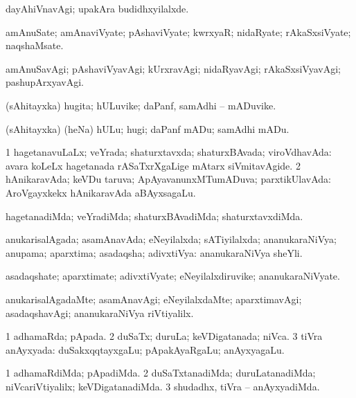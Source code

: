 \bentry
{}
\gl{\kirxvi}
\bmng
dayAhiVnavAgi; upakAra budidhxyilalxde. 
\emng
\eentry

\bentry
{}
\gl{\nA}
\bmng
amAnuSate; amAnaviVyate; pAshaviVyate; kwrxyaR; nidaRyate; rAkaSxsiVyate; naqshaMsate. 
\emng
\eentry

\bentry
{}
\gl{\kirxvi}
\bmng
amAnuSavAgi; pAshaviVyavAgi; kUrxravAgi; nidaRyavAgi; rAkaSxsiVyavAgi; pashupArxyavAgi. 
\emng
\eentry

\bentry
{}
\gl{\nA}
\bmng
(sAhitayxka) hugita; hULuvike; daPanf, samAdhi -- mADuvike. 
\emng
\eentry

\bentry
{}
\gl{\sakirx}
\bmng
(sAhitayxka) (heNa) hULu; hugi; daPanf mADu; samAdhi mADu. 
\emng
\eentry

\bentry
{}
\gl{\gu}
\bmng
\bnum
\num{1} hagetanavuLaLx; veYrada; shaturxtavxda; shaturxBAvada; viroVdhavAda:  avara koLeLx hagetanada rASaTxrXgaLige mAtarx siVmitavAgide. 
\num{2} hAnikaravAda; keVDu taruva; ApAyavanunxMTumADuva; parxtikUlavAda:  AroVgayxkekx hAnikaravAda aBAyxsagaLu. 
\enum
\emng
\eentry

\bentry
{}
\gl{\kirxvi}
\bmng
hagetanadiMda; veYradiMda; shaturxBAvadiMda; shaturxtavxdiMda. 
\emng
\eentry

\bentry
{}
\gl{\gu}
\bmng
anukarisalAgada; asamAnavAda; eNeyilalxda; sATiyilalxda; ananukaraNiVya; anupama; aparxtima; asadaqsha; adivxtiVya:  ananukaraNiVya sheYli. 
\emng
\eentry

\bentry
{}
\gl{\nA}
\bmng
asadaqshate; aparxtimate; adivxtiVyate; eNeyilalxdiruvike; ananukaraNiVyate. 
\emng
\eentry

\bentry
{}
\gl{\kirxvi}
\bmng
anukarisalAgadaMte; asamAnavAgi; eNeyilalxdaMte; aparxtimavAgi; asadaqshavAgi; ananukaraNiVya riVtiyalilx. 
\emng
\eentry

\bentry
{}
\gl{\gu}
\bmng
\bnum
\num{1} adhamaRda; pApada. 
\num{2} duSaTx; duruLa; keVDigatanada; niVca. 
\num{3} tiVra anAyxyada:  duSakxqqtayxgaLu; pApakAyaRgaLu; anAyxyagaLu. 
\enum
\emng
\eentry

\bentry
{}
\gl{\kirxvi}
\bmng
\bnum
\num{1} adhamaRdiMda; pApadiMda. 
\num{2} duSaTxtanadiMda; duruLatanadiMda; niVcariVtiyalilx; keVDigatanadiMda. 
\num{3} shudadhx, tiVra -- anAyxyadiMda. 
\enum
\emng
\eentry

